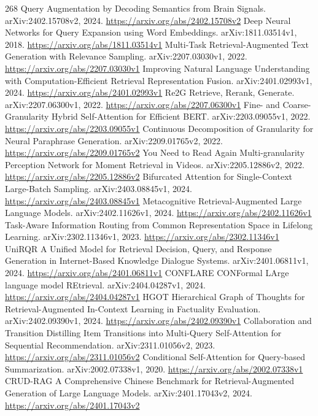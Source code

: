 \documentclass[11pt]{article}
\begin{document}
\begin{thebibliography}{268}
 Query Augmentation by Decoding Semantics from Brain Signals. arXiv:2402.15708v2, 2024. \url{https://arxiv.org/abs/2402.15708v2}
 Deep Neural Networks for Query Expansion using Word Embeddings. arXiv:1811.03514v1, 2018. \url{https://arxiv.org/abs/1811.03514v1}
 Multi-Task Retrieval-Augmented Text Generation with Relevance Sampling. arXiv:2207.03030v1, 2022. \url{https://arxiv.org/abs/2207.03030v1}
 Improving Natural Language Understanding with Computation-Efficient Retrieval Representation Fusion. arXiv:2401.02993v1, 2024. \url{https://arxiv.org/abs/2401.02993v1}
 Re2G Retrieve, Rerank, Generate. arXiv:2207.06300v1, 2022. \url{https://arxiv.org/abs/2207.06300v1}
 Fine- and Coarse-Granularity Hybrid Self-Attention for Efficient BERT. arXiv:2203.09055v1, 2022. \url{https://arxiv.org/abs/2203.09055v1}
 Continuous Decomposition of Granularity for Neural Paraphrase Generation. arXiv:2209.01765v2, 2022. \url{https://arxiv.org/abs/2209.01765v2}
 You Need to Read Again Multi-granularity Perception Network for Moment Retrieval in Videos. arXiv:2205.12886v2, 2022. \url{https://arxiv.org/abs/2205.12886v2}
 Bifurcated Attention for Single-Context Large-Batch Sampling. arXiv:2403.08845v1, 2024. \url{https://arxiv.org/abs/2403.08845v1}
 Metacognitive Retrieval-Augmented Large Language Models. arXiv:2402.11626v1, 2024. \url{https://arxiv.org/abs/2402.11626v1}
 Task-Aware Information Routing from Common Representation Space in Lifelong Learning. arXiv:2302.11346v1, 2023. \url{https://arxiv.org/abs/2302.11346v1}
 UniRQR A Unified Model for Retrieval Decision, Query, and Response Generation in Internet-Based Knowledge Dialogue Systems. arXiv:2401.06811v1, 2024. \url{https://arxiv.org/abs/2401.06811v1}
 CONFLARE CONFormal LArge language model REtrieval. arXiv:2404.04287v1, 2024. \url{https://arxiv.org/abs/2404.04287v1}
 HGOT Hierarchical Graph of Thoughts for Retrieval-Augmented In-Context Learning in Factuality Evaluation. arXiv:2402.09390v1, 2024. \url{https://arxiv.org/abs/2402.09390v1}
 Collaboration and Transition Distilling Item Transitions into Multi-Query Self-Attention for Sequential Recommendation. arXiv:2311.01056v2, 2023. \url{https://arxiv.org/abs/2311.01056v2}
 Conditional Self-Attention for Query-based Summarization. arXiv:2002.07338v1, 2020. \url{https://arxiv.org/abs/2002.07338v1}
 CRUD-RAG A Comprehensive Chinese Benchmark for Retrieval-Augmented Generation of Large Language Models. arXiv:2401.17043v2, 2024. \url{https://arxiv.org/abs/2401.17043v2}

\end{thebibliography}
\end{document}
